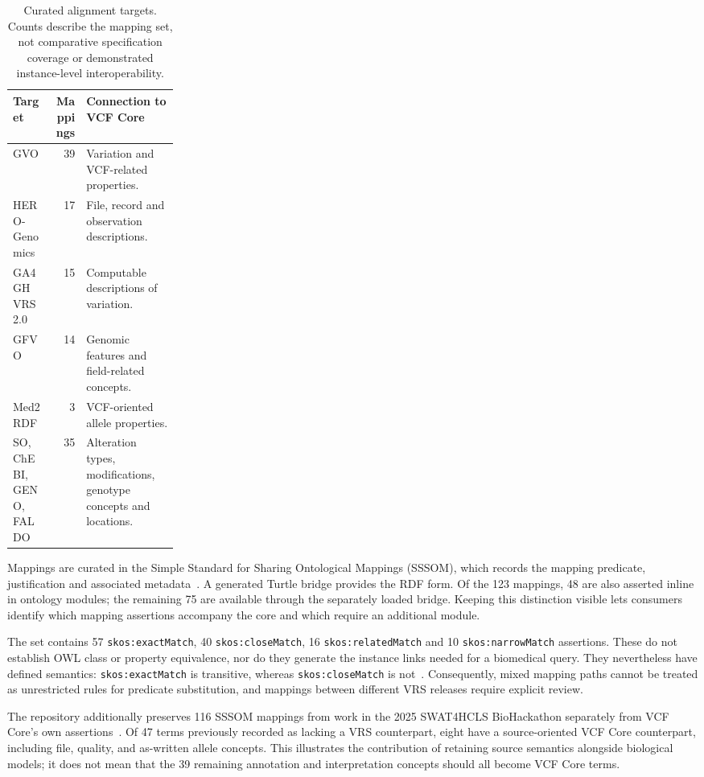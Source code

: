 \documentclass{ceurart}
\newcommand{\term}[1]{\texttt{#1}}
\begin{document}
\begin{table}[htbp]
\caption{Curated alignment targets. Counts describe the mapping set, not comparative specification coverage or demonstrated instance-level interoperability.}
\label{tab:alignments}
\centering\small
\begin{tabularx}{\linewidth}{@{}p{0.24\linewidth}rX@{}}
\toprule
Target & Mappings & Connection to VCF Core \\
\midrule
GVO & 39 & Variation and VCF-related properties. \\
HERO-Genomics & 17 & File, record and observation descriptions. \\
GA4GH VRS 2.0 & 15 & Computable descriptions of variation. \\
GFVO & 14 & Genomic features and field-related concepts. \\
Med2RDF & 3 & VCF-oriented allele properties. \\
SO, ChEBI, GENO, FALDO & 35 & Alteration types, modifications, genotype concepts and locations. \\
\bottomrule
\end{tabularx}
\end{table}

Mappings are curated in the Simple Standard for Sharing Ontological Mappings (SSSOM), which records the mapping predicate, justification and associated metadata~\cite{matentzoglu2022sssom}. 
A generated Turtle bridge provides the RDF form. 
Of the 123 mappings, 48 are also asserted inline in ontology modules; the remaining 75 are available through the separately loaded bridge. 
Keeping this distinction visible lets consumers identify which mapping assertions accompany the core and which require an additional module.

The set contains 57 \term{skos:exactMatch}, 40 \term{skos:closeMatch}, 16 \term{skos:relatedMatch} and 10 \term{skos:narrowMatch} assertions. 
These do not establish OWL class or property equivalence, nor do they generate the instance links needed for a biomedical query. 
They nevertheless have defined semantics: \term{skos:exactMatch} is transitive, whereas \term{skos:closeMatch} is not~\cite{skos2009}. 
Consequently, mixed mapping paths cannot be treated as unrestricted rules for predicate substitution, and mappings between different VRS releases require explicit review.

The repository additionally preserves 116 SSSOM mappings from work in the 2025 SWAT4HCLS BioHackathon separately from VCF Core's own assertions~\cite{bh25}. 
Of 47 terms previously recorded as lacking a VRS counterpart, eight have a source-oriented VCF Core counterpart, including file, quality, and as-written allele concepts. 
This illustrates the contribution of retaining source semantics alongside biological models; it does not mean that the 39 remaining annotation and interpretation concepts should all become VCF Core terms.
\end{document}

